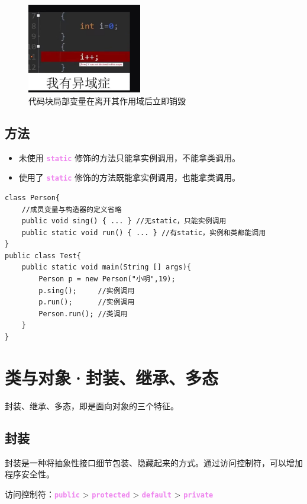 \documentclass[UTF8]{ctexart}
\newcommand\keyword[1]{\textcolor{violet}{\textbf{\texttt{#1}}}}
\begin{document}
\begin{figure}[htb]
  \centering
  \includegraphics[width=5cm]{代码块局部变量.jpg}
  \caption{代码块局部变量在离开其作用域后立即销毁}\label{fig:codeBlockVar}
\end{figure}

\subsection{方法}

\begin{itemize}[itemsep=0pt,parsep=0pt]
  \item 未使用 \keyword{static} 修饰的方法只能拿实例调用，不能拿类调用。
  \item 使用了 \keyword{static} 修饰的方法既能拿实例调用，也能拿类调用。
\end{itemize}

\begin{lstlisting}
class Person{
    //成员变量与构造器的定义省略
    public void sing() { ... } //无static，只能实例调用
    public static void run() { ... } //有static，实例和类都能调用
}
public class Test{
    public static void main(String [] args){
        Person p = new Person("小明",19);
        p.sing();     //实例调用
        p.run();      //实例调用
        Person.run(); //类调用
    }
}
\end{lstlisting}

\section{类与对象·封装、继承、多态}
封装、继承、多态，即是面向对象的三个特征。

\subsection{封装}
封装是一种将抽象性接口细节包装、隐藏起来的方式。通过访问控制符，可以增加程序安全性。

访问控制符：\keyword{public} > \keyword{protected} > \keyword{default} > \keyword{private}
\end{document}

